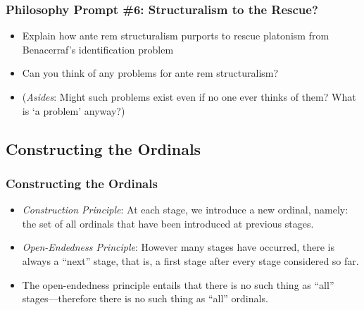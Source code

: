 \begin{frame}
\frametitle{Philosophy Prompt \#6: Structuralism to the Rescue?}

\begin{itemize}[<+->]

\item Explain how ante rem structuralism purports to rescue platonism from Benacerraf's identification problem

\item Can you think of any problems for ante rem structuralism?

\item (\textit{Asides}: Might such problems exist even if no one ever thinks of them? What is `a problem' anyway?) 

\end{itemize}
\end{frame}



\subsection{Constructing the Ordinals}

\begin{frame}
\frametitle{Constructing the Ordinals}

\begin{itemize}[<+->]

\item \emph{Construction Principle}: At each stage, we introduce a new ordinal, namely: the set of all ordinals that have been introduced at previous stages.

\item \emph{Open-Endedness Principle}: However many stages have occurred, there is always a ``next'' stage, that is, a first stage after every stage considered so far.

\item The open-endedness principle entails that there is no such thing as ``all'' stages---therefore there is no such thing as ``all'' ordinals.

\end{itemize}
\end{frame}

